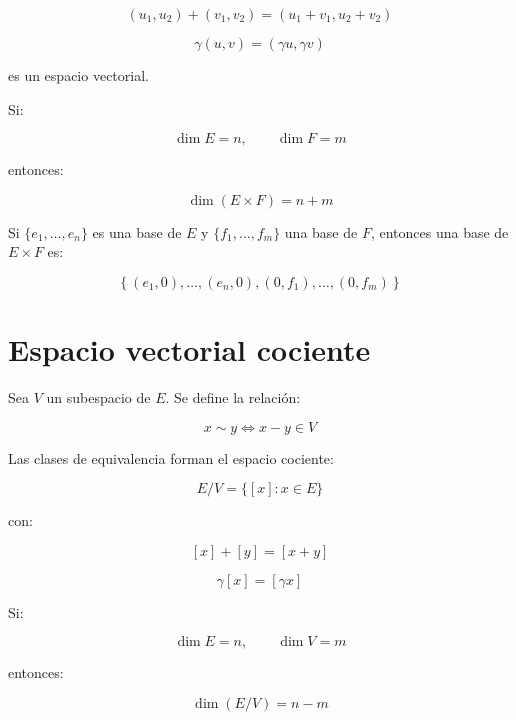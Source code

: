 \documentclass[11pt,a4paper]{article}
\newcommand{\dimn}{\operatorname{dim}}
\begin{document}
\[
(u_1,u_2)+(v_1,v_2)
=
(u_1+v_1,u_2+v_2)
\]

\[
\gamma(u,v)
=
(\gamma u,\gamma v)
\]

es un espacio vectorial.

Si:

\[
\dimn E=n,
\qquad
\dimn F=m
\]

entonces:

\[
\boxed{
\dimn(E\times F)=n+m
}
\]

Si $\{e_1,\ldots,e_n\}$ es una base de $E$ y $\{f_1,\ldots,f_m\}$ una base de $F$, entonces una base de $E\times F$ es:

\[
\left\{
(e_1,0),\ldots,(e_n,0),
(0,f_1),\ldots,(0,f_m)
\right\}
\]

\section{Espacio vectorial cociente}

Sea $V$ un subespacio de $E$. Se define la relación:

\[
x\sim y
\iff
x-y\in V
\]

Las clases de equivalencia forman el espacio cociente:

\[
E/V
=
\{[x]:
x\in E\}
\]

con:

\[
[x]+[y]=[x+y]
\]

\[
\gamma[x]=[\gamma x]
\]

Si:

\[
\dimn E=n,
\qquad
\dimn V=m
\]

entonces:

\[
\boxed{
\dimn(E/V)=n-m
}
\]
\end{document}
